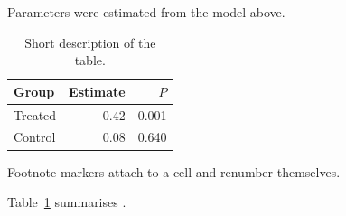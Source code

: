 \noindent
Parameters were estimated from the model above.

\begin{table}[tb]
  \centering
  \begin{threeparttable}
    \caption{Short description of the table.}
    \label{tab:example}
    \small
    \begin{tabular}{l r r}
      \toprule
      Group & Estimate & $P$ \\
      \midrule
      Treated & 0.42 & 0.001 \\
      Control & 0.08 & 0.640\tnote{a} \\
      \bottomrule
    \end{tabular}
    \begin{tablenotes}[flushleft]\footnotesize
      \item[a] Footnote markers attach to a cell and renumber themselves.
    \end{tablenotes}
  \end{threeparttable}
\end{table}

Table~\ref{tab:example} summarises .

